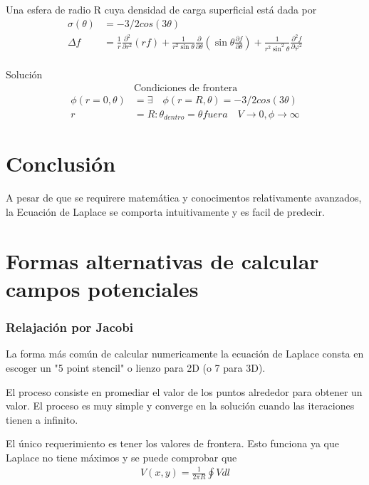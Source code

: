 \documentclass[10pt,journal,compsoc]{IEEEtran}
\begin{document}
Una esfera de radio R cuya densidad de carga superficial está dada por\\

\begin{align*}
  \sigma(\theta) &= -3/2cos(3\theta) \\
  \Delta f&={\frac {1}{r}}{\frac {\partial ^{2}}{\partial r^{2}}}(rf)+{\frac {1}{r^{2}\sin \theta }}{\frac {\partial }{\partial \theta }}\left(\sin \theta {\frac {\partial f}{\partial \theta }}\right)+{\frac {1}{r^{2}\sin ^{2}\theta }}{\frac {\partial ^{2}f}{\partial \varphi ^{2}}}\\
\end{align*}

Solución 
\begin{align*}
  &\text{Condiciones de frontera}\\
  \phi(r=0, \theta) &= \exists \quad \phi(r=R, \theta) = -3/2cos(3\theta)\\
  r &= R: \theta_{dentro} = \theta{fuera} \quad V \to 0, \phi \to \infty 
\end{align*}

\section{Conclusión}

A pesar de que se requirere matemática y conocimentos relativamente avanzados,
la Ecuación de Laplace se comporta intuitivamente y es facil de predecir.

\appendices
\section{Formas alternativas de calcular campos potenciales}

\subsubsection{Relajación por Jacobi}

La forma más común de calcular numericamente la ecuación de Laplace
consta en escoger un "5 point stencil" o lienzo para 2D (o 7 para 3D).

El proceso consiste en promediar el valor de los puntos alrededor para
obtener un valor. El proceso es muy simple y converge en la solución 
cuando las iteraciones tienen a infinito. 

El único requerimiento es tener los valores de frontera. Esto funciona
ya que Laplace no tiene máximos y se puede comprobar que
\begin{align*}
  V(x,y) = \frac{1}{2\pi R} \oint V dl
\end{align*} 
\end{document}
